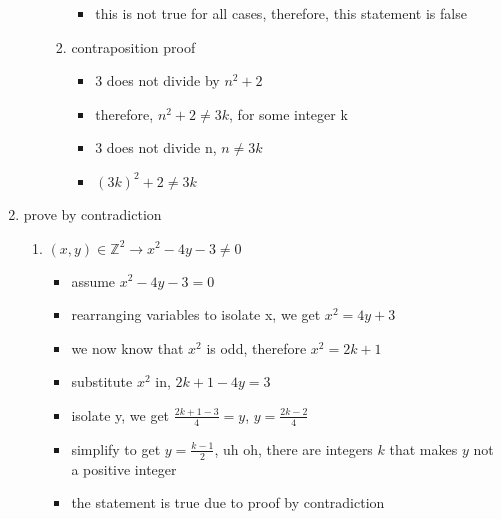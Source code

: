 \documentclass[12pt]{article}
\begin{document}
\begin{enumerate}
\begin{enumerate}
\begin{enumerate}
\begin{itemize}
                    \item this is not true for all cases, therefore, this statement is false
                \end{itemize}
                \item contraposition proof
                \begin{itemize}
                    \item 3 does not divide by $n^2 + 2$
                    \item therefore, $n^2 + 2 \neq 3k$, for some integer k
                    \item 3 does not divide n, $n \neq 3k$
                    \item $(3k)^2 + 2 \neq 3k$
                \end{itemize}
            \end{enumerate}
        \end{enumerate}
        
        \item prove by contradiction
        \begin{enumerate}
            \item $(x, y) \in \mathbb{Z}^2 \rightarrow x^2 - 4y -3 \neq 0$
            \begin{itemize}
                \item assume $x^2 - 4y - 3 = 0$
                \item rearranging variables to isolate x, we get $x^2 = 4y + 3$
                \item we now know that $x^2$ is odd, therefore $x^2 = 2k+1$
                \item substitute $x^2$ in, $2k + 1 - 4y = 3$
                \item isolate y, we get $\frac{2k + 1 - 3}{4} = y$, $y = \frac{2k-2}{4}$
                \item simplify to get $y = \frac{k - 1}{2}$, uh oh, there are integers $k$ that makes $y$ not a positive integer
                \item the statement is true due to proof by contradiction
            \end{itemize}
        \end{enumerate}
        

\end{enumerate}
\end{document}
